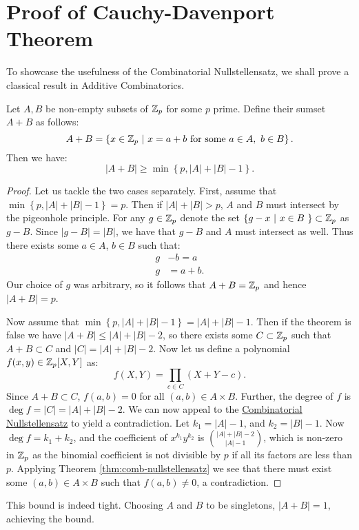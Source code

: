 \section{Proof of Cauchy-Davenport Theorem}
To showcase the usefulness of the Combinatorial Nullstellensatz, we shall prove a classical result in Additive Combinatorics. 
\begin{theorem} 
    Let $A,B$ be non-empty subsets of $\mathbb Z_p$ for some $p$ prime. Define their sumset $A+B$ as follows:
    \[
    A + B = 
    \left\{ x \in \mathbb Z_p\ | \ x = a+b \text{  for some } a\in A, \ b \in B \right\}.
    \]
    Then we have:
    \[
    |A+B| \geq  \min \left\{p, |A| + |B| -1 \right\}.
    \]
\end{theorem}

\begin{proof}
    Let us tackle the two cases separately. First, assume that $\min \left\{p, |A| + |B| -1 \right\} = p$.
    Then if $|A| + |B| > p$, $A$ and $B$ must intersect by the pigeonhole principle.
    For any $g \in \mathbb Z_p$ denote the set  $\left\{ g - x  \ | \ x \in B \  \right\} \subset \mathbb Z_p$ as $g-B$. Since $|g-B| = |B|$, we have that 
    $g-B$ and $A$ must intersect as well. Thus there exists some $a \in A$, $b \in B$ such that: 
    \begin{align*}
        g& -b = a \\
        g& = a+b.
    \end{align*}
    Our choice of $g$ was arbitrary, so it follows that $A+B = \mathbb Z_p$ and hence $|A+B| = p$.

    Now assume that $\min \left\{p, |A| + |B| -1 \right\} = |A| + |B| -1$. Then if the theorem is false we have $|A+B| \leq |A| + |B| -2$, so there exists some $C \subset \mathbb Z_p$ such that 
    $A+B \subset C$ and $|C| =  |A| + |B| -2$. Now let us define a polynomial $f(x,y) \in \mathbb Z_p [X,Y]$ as:
    \[
        f(X,Y) = \prod_{c \in C} (X+Y -c).
    \]
    Since $A+B \subset C$, $f(a,b) =0$ for all $(a,b) \in A\times B$. Further, the degree of $f$ is $\deg f = |C| = |A| + |B| -2$. 
    We can now appeal to the \hyperref[thm:comb-nullstellensatz]{Combinatorial Nullstellensatz} to yield a contradiction. Let $k_1 = |A| -1$, and $k_2 = |B|-1$. 
    Now $\deg f = k_1 + k_2$, and the coefficient of $x^{k_1}y^{k_2}$ is
    ${|A|+|B| - 2} \choose {|A|- 1}$, which is non-zero in $\mathbb Z_p$ as the binomial coefficient is not divisible by $p$ if all its factors are less than $p$. Applying Theorem \ref{thm:comb-nullstellensatz} we see that there 
    must exist some $(a,b) \in A \times B$ such that $f(a,b) \neq 0$, a contradiction.
\end{proof}
\begin{remark}
    This bound is indeed tight. Choosing $A$ and $B$ to be singletons, $|A+B| =1$, achieving the bound.
\end{remark}